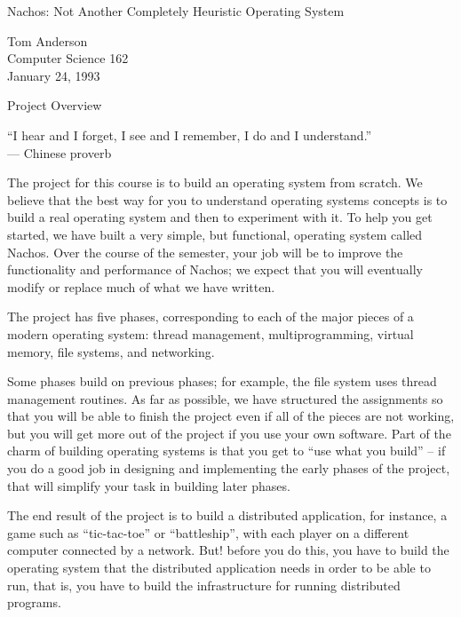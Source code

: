 


\begin{center}
{\large Nachos: Not Another Completely Heuristic Operating System

\vspace{.2in}
Tom Anderson\\
Computer Science 162\\
January 24, 1993

\vspace{.2in}
Project Overview
}

\vspace{.2in}

``I hear and I forget, I see and I remember, I do and I understand.''\\
--- Chinese proverb
\end{center}

The project for this course is to build an operating system from scratch.
We believe that the best way for you to understand operating systems
concepts is to build a real operating system and then to experiment with it.
To help you get started, we have built a very simple, but functional, 
operating system called Nachos.
Over the course of the semester, your job will be to improve the 
functionality and performance of Nachos; we expect that you will 
eventually modify or replace much of what we have written.

The project has five phases, corresponding to each of the major pieces 
of a modern operating system: thread management, 
multiprogramming, virtual memory, file systems, and networking.

Some phases build on previous phases; for example, the file system 
uses thread management routines.
As far as possible, we have structured the assignments so that you 
will be able to finish the project even if all of the pieces are not working,
but you will get more out of the project if you use your own software.
Part of the charm of building operating systems is that you get to 
``use what you build'' -- if you do a good job in designing and 
implementing the early phases of the project, that will simplify your 
task in building later phases.

The end result of the project is to build a distributed application,
for instance, a game such as
``tic-tac-toe'' or ``battleship'', with each player on a different
computer connected by a network.  But! before you do this, you
have to build the operating system that the distributed application needs
in order to be able to run, that is, you have to build the infrastructure 
for running distributed programs.

